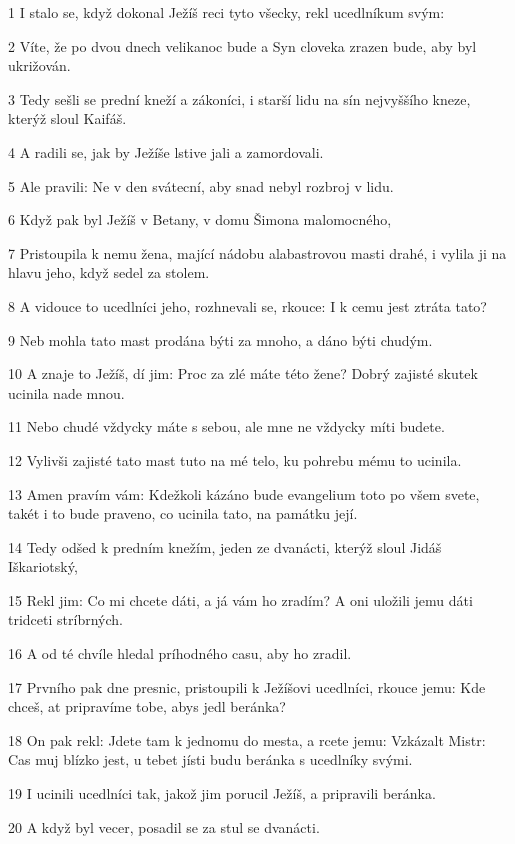 \par 1 I stalo se, když dokonal Ježíš reci tyto všecky, rekl ucedlníkum svým:
\par 2 Víte, že po dvou dnech velikanoc bude a Syn cloveka zrazen bude, aby byl ukrižován.
\par 3 Tedy sešli se prední kneží a zákoníci, i starší lidu na sín nejvyššího kneze, kterýž sloul Kaifáš.
\par 4 A radili se, jak by Ježíše lstive jali a zamordovali.
\par 5 Ale pravili: Ne v den svátecní, aby snad nebyl rozbroj v lidu.
\par 6 Když pak byl Ježíš v Betany, v domu Šimona malomocného,
\par 7 Pristoupila k nemu žena, mající nádobu alabastrovou masti drahé, i vylila ji na hlavu jeho, když sedel za stolem.
\par 8 A vidouce to ucedlníci jeho, rozhnevali se, rkouce: I k cemu jest ztráta tato?
\par 9 Neb mohla tato mast prodána býti za mnoho, a dáno býti chudým.
\par 10 A znaje to Ježíš, dí jim: Proc za zlé máte této žene? Dobrý zajisté skutek ucinila nade mnou.
\par 11 Nebo chudé vždycky máte s sebou, ale mne ne vždycky míti budete.
\par 12 Vylivši zajisté tato mast tuto na mé telo, ku pohrebu mému to ucinila.
\par 13 Amen pravím vám: Kdežkoli kázáno bude evangelium toto po všem svete, takét i to bude praveno, co ucinila tato, na památku její.
\par 14 Tedy odšed k predním knežím, jeden ze dvanácti, kterýž sloul Jidáš Iškariotský,
\par 15 Rekl jim: Co mi chcete dáti, a já vám ho zradím? A oni uložili jemu dáti tridceti stríbrných.
\par 16 A od té chvíle hledal príhodného casu, aby ho zradil.
\par 17 Prvního pak dne presnic, pristoupili k Ježíšovi ucedlníci, rkouce jemu: Kde chceš, at pripravíme tobe, abys jedl beránka?
\par 18 On pak rekl: Jdete tam k jednomu do mesta, a rcete jemu: Vzkázalt Mistr: Cas muj blízko jest, u tebet jísti budu beránka s ucedlníky svými.
\par 19 I ucinili ucedlníci tak, jakož jim porucil Ježíš, a pripravili beránka.
\par 20 A když byl vecer, posadil se za stul se dvanácti.
